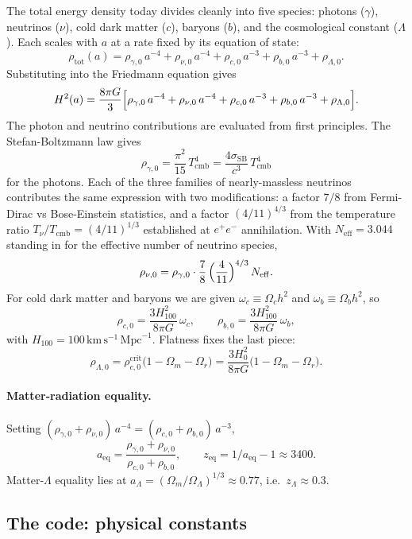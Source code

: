 The total energy density today divides cleanly into five species: photons ($\gamma$), neutrinos ($\nu$), cold dark matter ($c$), baryons ($b$), and the cosmological constant ($\Lambda$). Each scales with $a$ at a rate fixed by its equation of state:
\[
  \rho_\mathrm{tot}(a) = \rho_{\gamma,0}\, a^{-4} + \rho_{\nu,0}\, a^{-4} + \rho_{c,0}\, a^{-3} + \rho_{b,0}\, a^{-3} + \rho_{\Lambda,0}.
\]
Substituting into the Friedmann equation gives
\begin{equation}
  H^2(a) = \frac{8\pi G}{3}\Bigl[\rho_{\gamma,0}\, a^{-4} + \rho_{\nu,0}\, a^{-4} + \rho_{c,0}\, a^{-3} + \rho_{b,0}\, a^{-3} + \rho_{\Lambda,0}\Bigr].
  \label{eq:Hofa}
\end{equation}
The photon and neutrino contributions are evaluated from first principles. The Stefan-Boltzmann law gives
\[
  \rho_{\gamma,0} = \frac{\pi^2}{15}\, T_\mathrm{cmb}^4 = \frac{4\sigma_\mathrm{SB}}{c^3}\, T_\mathrm{cmb}^4
\]
for the photons. Each of the three families of nearly-massless neutrinos contributes the same expression with two modifications: a factor $7/8$ from Fermi-Dirac vs Bose-Einstein statistics, and a factor $(4/11)^{4/3}$ from the temperature ratio $T_\nu/T_\mathrm{cmb} = (4/11)^{1/3}$ established at $e^+ e^-$ annihilation. With $N_\mathrm{eff} = 3.044$ standing in for the effective number of neutrino species,
\[
  \rho_{\nu,0} = \rho_{\gamma,0}\cdot \frac{7}{8}\,\Bigl(\frac{4}{11}\Bigr)^{4/3}\, N_\mathrm{eff}.
\]
For cold dark matter and baryons we are given $\omega_c \equiv \Omega_c h^2$ and $\omega_b \equiv \Omega_b h^2$, so
\[
  \rho_{c,0} = \frac{3 H_{100}^2}{8\pi G}\,\omega_c,
  \qquad
  \rho_{b,0} = \frac{3 H_{100}^2}{8\pi G}\,\omega_b,
\]
with $H_{100} = 100\,\mathrm{km}\,\mathrm{s}^{-1}\,\mathrm{Mpc}^{-1}$. Flatness fixes the last piece:
\[
  \rho_{\Lambda,0} = \rho_{c,0}^\mathrm{crit}\bigl(1 - \Omega_m - \Omega_r\bigr) = \frac{3 H_0^2}{8\pi G}\bigl(1 - \Omega_m - \Omega_r\bigr).
\]

\paragraph{Matter-radiation equality.}
Setting $(\rho_{\gamma,0} + \rho_{\nu,0})\, a^{-4} = (\rho_{c,0} + \rho_{b,0})\, a^{-3}$,
\[
  a_\mathrm{eq} = \frac{\rho_{\gamma,0} + \rho_{\nu,0}}{\rho_{c,0} + \rho_{b,0}},
  \qquad
  z_\mathrm{eq} = 1/a_\mathrm{eq} - 1 \approx 3400.
\]
Matter-$\Lambda$ equality lies at $a_\Lambda = (\Omega_m/\Omega_\Lambda)^{1/3} \approx 0.77$, i.e.\ $z_\Lambda \approx 0.3$.

\subsection{The code: physical constants}

